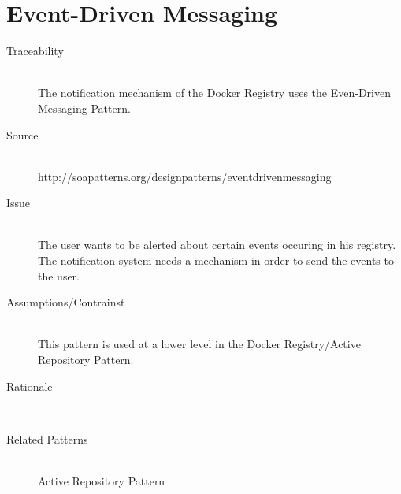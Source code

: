 \begin{description}
\end{description}

\section{Event-Driven Messaging}

\begin{description}

\item[Traceability]~\\
The notification mechanism of the Docker Registry uses the Even-Driven Messaging Pattern.

\item[Source]~\\
http://soapatterns.org/designpatterns/eventdrivenmessaging

\item[Issue]~\\ The user wants to be alerted about certain events occuring in his registry.
The notification system needs a mechanism in order to send the events to the user.

\item[Assumptions/Contrainst]~\\ This pattern is used at a lower level in the Docker Registry/Active Repository Pattern.


\item[Rationale]~\\ 


\item [Related Patterns]~\\
Active Repository Pattern


\end{description}

